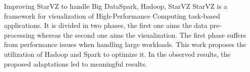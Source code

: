\begin{abstract}
O StarVZ é um arcabouço para visualização de rastros de aplicações 
orientadas a tarefas no contexto de \textit{High-Performance Computing}. Ele é 
separado em duas fases, a primeira voltada para o pré-processamento dos dados e 
a segunda para a exibição. Essa primeira fase sofre de problemas de desempenho 
ao trabalhar com grandes volumes de dados. Este trabalho se propõe a utilizar o 
Hadoop e o Spark para otimizá-la. Nos resultados observados, as adaptações 
propostas levaram a resultados significativos.
\end{abstract}

\begin{englishabstract}{Improving StarVZ to handle Big Data}{Spark, 
Hadoop, StarVZ}
StarVZ is a framework for visualization of High-Performance Computing task-based 
applications. It is divided in two phases, the first one aims the data 
pre-processing whereas the second one aims the visualization. The 
first phase suffers from performance issues when handling large workloads. 
This work proposes the utilization of Hadoop and Spark to optimize it. In the 
observed results, the proposed adaptations led to meaningful results.
\end{englishabstract}